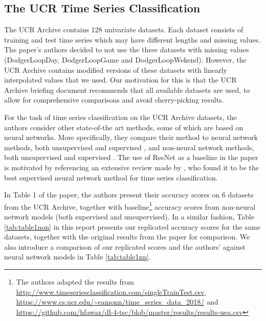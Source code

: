 \newpage
\subsection{The UCR Time Series Classification}
\label{ucr}

The UCR Archive contains 128 univariate datasets. Each dataset consists of training and test time series which may have different lengths and missing values. The paper's authors decided to not use the three datasets with missing values (DodgerLoopDay, DodgerLoopGame and DodgerLoopWekend). However, the UCR Archive contains modified versions of these datasets with linearly interpolated values that we used. Our motivation for this is that the UCR Archive briefing document recommends that all available datasets are used, to allow for comprehensive comparisons and avoid cherry-picking results.


For the task of time series classification on the UCR Archive datasets, the authors consider other state-of-the art methods, some of which are based on neural networks. More specifically, they compare their method to neural network methods, both unsupervised \cite{TimenetMalhotraTVAS17, RWSwu2018random} and supervised \cite{ResNetHe2015}, and non-neural network methods, both unsupervised \cite{lei2017similarity} and supervised \cite{hivecote, STBostrombagnall, BOSSSchafer:2015:BCT:2833463.2833468, EELines2015}.
The use of ResNet as a baseline in the paper is motivated by referencing an extensive review made by \cite{fawaz2019deep}, who found it to be the best supervised neural network method for time series classification.


In Table 1 of the paper, the authors present their accuracy scores on 6 datasets from the UCR Archive, together with baseline\footnote{The authors adapted the results from \url{http://www.timeseriesclassification.com/singleTrainTest.csv}, \url{https://www.cs.ucr.edu/~eamonn/time_series_data_2018/} and \url{https://github.com/hfawaz/dl-4-tsc/blob/master/results/results-uea.csv}}
accuracy scores from non-neural network models (both supervised and unsupervised). In a similar fashion, Table \ref{tab:table1non} in this report presents our replicated accuracy scores for the same datasets, together with the original results from the paper for comparison. We also introduce a comparison of our replicated scores and the authors' against neural network models in Table \ref{tab:table1nn}.

